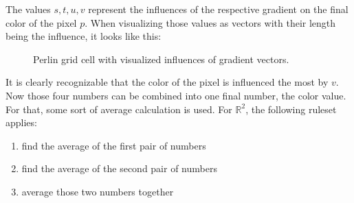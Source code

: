 \noindent
The values $s, t, u, v$ represent the influences of the respective gradient on the final color of the pixel $p$. 
When visualizing those values as vectors with their length being the influence, it looks like this:
\begin{figure}[H]
    \centering
    \caption{Perlin grid cell with visualized influences of gradient vectors.}
    \label{img:tikz:noise:perlin:influences}
\end{figure}

\noindent
\begin{minipage}{\linewidth}
It is clearly recognizable that the color of the pixel is influenced the most by $v$. Now those four numbers can be combined into one final number, the color value.
For that, some sort of average calculation is used. For $\mathbb{R}^2$, the following ruleset applies:

\begin{enumerate}
    \item find the average of the first pair of numbers
    \item find the average of the second pair of numbers
    \item average those two numbers together
\end{enumerate}
\end{minipage}
\vspace{\baselineskip}

